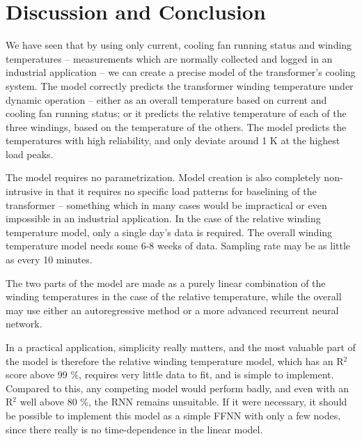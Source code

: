 \documentclass[]{article}
\begin{document}
\clearpage
\section{Discussion and Conclusion} \label{sec:conclusion}

We have seen that by using only current, cooling fan running status and winding temperatures -- measurements which are normally collected and logged in an industrial application -- we can create a precise model of the transformer's cooling system. The model correctly predicts the transformer winding temperature under dynamic operation -- either as an overall temperature based on current and cooling fan running status; or it predicts the relative temperature of each of the three windings, based on the temperature of the others. The model predicts the temperatures with high reliability, and only deviate around 1 K at the highest load peaks.

The model requires no parametrization. Model creation is also completely non-intrusive in that it requires no specific load patterns for baselining of the transformer -- something which in many cases would be impractical or even impossible in an industrial application. In the case of the relative winding temperature model, only a single day's data is required. The overall winding temperature model needs some 6-8 weeks of data. Sampling rate may be as little as every 10 minutes.

The two parts of the model are made as a purely linear combination of the winding temperatures in the case of the relative temperature, while the overall may use either an autoregressive method or a more advanced recurrent neural network. 

In a practical application, simplicity really matters, and the most valuable part of the model is therefore the relative winding temperature model, which has an R$^2$ score above 99 \%, requires very little data to fit, and is simple to implement. Compared to this, any competing model would perform badly, and even with an R$^2$ well above 80 \%, the RNN remains unsuitable. If it were necessary, it should be possible to implement this model as a simple FFNN with only a few nodes, since there really is no time-dependence in the linear model.
\end{document}
